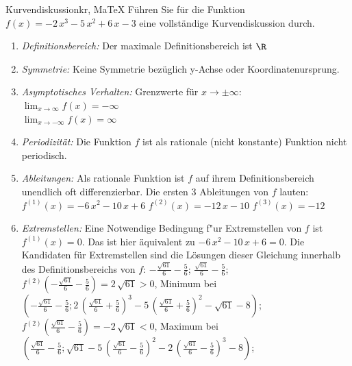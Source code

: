  \providecommand{\MoIl}{(} 
 \providecommand{\MoIr}{)}
 \providecommand{\MIntvlSep}{;} 
 \providecommand{\MElSetSep}{;} 
 \begin{MAufgabe}{Kurvendiskussion}{kr, MaTeX}
 F\"uhren Sie f\"ur die Funktion $f(x)= - 2\, x^3 - 5\, x^2 + 6\, x - 3$ eine vollst\"andige Kurvendiskussion durch.\\ 
 \ifLsg\Loesung
 \begin{enumerate}
 \item \emph{Definitionsbereich:} 
 Der maximale Definitionsbereich ist $\R$\item \emph{Symmetrie:} 
 Keine Symmetrie bez\"uglich y-Achse oder Koordinatenursprung.\item \emph{Asymptotisches Verhalten:} 
 Grenzwerte f\"ur $x\rightarrow \pm \infty$: \\ 
 $\lim_{x\rightarrow \infty} f(x)=- \infty$ \\ 
 $\lim_{x\rightarrow -\infty} f(x)=\infty$ \\ 
 \item \emph{Periodizit\"at:} 
 Die Funktion $f$ ist als rationale (nicht konstante) Funktion nicht periodisch.\item \emph{Ableitungen:} 
 Als rationale Funktion ist $f$ auf ihrem Definitionsbereich unendlich oft differenzierbar. 
 Die ersten 3 Ableitungen von $f$ lauten: \\ 
 $f^{(1)}(x)= - 6\, x^2 - 10\, x + 6$\newline 
  $f^{(2)}(x)= - 12\, x - 10$\newline 
  $f^{(3)}(x)=-12$\newline 
  \item \emph{Extremstellen:} 
 Eine Notwendige Bedingung f"ur Extremstellen von $f$ ist $f^{(1)}(x)=0$. 
 Das ist hier \"aquivalent zu $ - 6\, x^2 - 10\, x + 6=0$. 
 Die Kandidaten f\"ur Extremstellen sind die L\"osungen dieser Gleichung innerhalb des Definitionsbereichs von $f$: $ - \frac{\sqrt{61}}{6} - \frac{5}{6}$; $\frac{\sqrt{61}}{6} - \frac{5}{6}$; \\ 
 $f^{(2)}( - \frac{\sqrt{61}}{6} - \frac{5}{6})=2\, \sqrt{61}$$>0$, Minimum bei $( - \frac{\sqrt{61}}{6} - \frac{5}{6};2\, {\left(\frac{\sqrt{61}}{6} + \frac{5}{6}\right)}^3 - 5\, {\left(\frac{\sqrt{61}}{6} + \frac{5}{6}\right)}^2 - \sqrt{61} - 8)$; \\ 
 $f^{(2)}(\frac{\sqrt{61}}{6} - \frac{5}{6})=- 2\, \sqrt{61}$$<0$, Maximum bei $(\frac{\sqrt{61}}{6} - \frac{5}{6};\sqrt{61} - 5\, {\left(\frac{\sqrt{61}}{6} - \frac{5}{6}\right)}^2 - 2\, {\left(\frac{\sqrt{61}}{6} - \frac{5}{6}\right)}^3 - 8)$; \\ 

\end{enumerate}
\end{MAufgabe}
